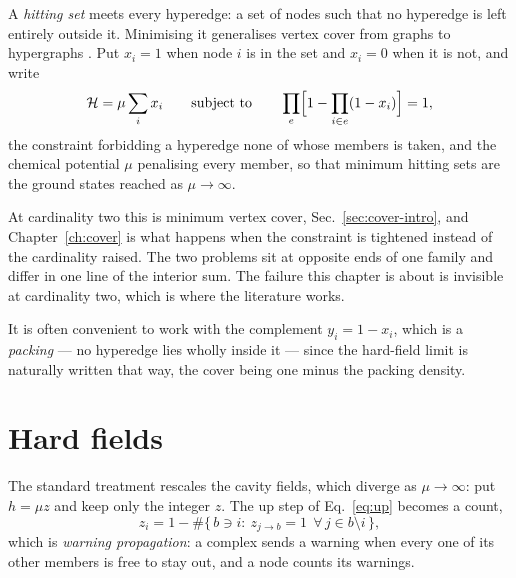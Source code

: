 A \emph{hitting set} meets every hyperedge: a set of nodes such that no
hyperedge is left entirely outside it. Minimising it generalises vertex cover
from graphs to hypergraphs \citep{mezard2007}. Put $x_{i}=1$ when node $i$ is in
the set and $x_{i}=0$ when it is not, and write
\begin{equation}
  \mathcal{H}=\mu\sum_{i}x_{i}
  \qquad\text{subject to}\qquad
  \prod_{e}\Bigl[1-\prod_{i\in e}(1-x_{i})\Bigr]=1,
  \label{eq:Hhs}
\end{equation}
the constraint forbidding a hyperedge none of whose members is taken, and the
chemical potential $\mu$ penalising every member, so that minimum hitting sets
are the ground states reached as $\mu\to\infty$.

At cardinality two this is minimum vertex cover, Sec.~\ref{sec:cover-intro}, and
Chapter~\ref{ch:cover} is what happens when the constraint is tightened instead
of the cardinality raised. The two problems sit at opposite ends of one family
and differ in one line of the interior sum. The failure this chapter is about is
invisible at cardinality two, which is where the literature works.

It is often convenient to work with the complement $y_{i}=1-x_{i}$, which is a
\emph{packing} --- no hyperedge lies wholly inside it --- since the hard-field
limit is naturally written that way, the cover being one minus the packing
density.

\section{Hard fields}
\label{sec:hard}

The standard treatment rescales the cavity fields, which diverge as
$\mu\to\infty$: put $h=\mu z$ and keep only the integer $z$. The up step of
Eq.~\eqref{eq:up} becomes a count,
\begin{equation}
  z_{i}=1-\#\bigl\{\,b\ni i:\ z_{j\to b}=1\ \ \forall\,j\in b\setminus i\,\bigr\},
  \label{eq:zhs}
\end{equation}
which is \emph{warning propagation}: a complex sends a warning when every one of
its other members is free to stay out, and a node counts its warnings.

